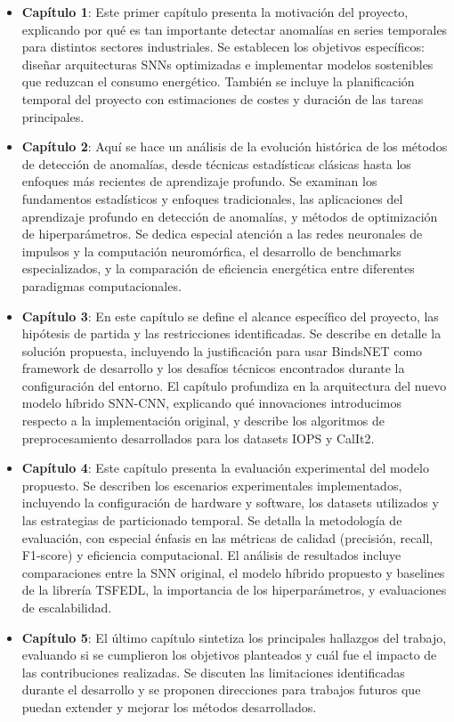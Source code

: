 \begin{itemize}
    \item\textbf{Capítulo 1}: Este primer capítulo presenta la motivación del proyecto, explicando por qué es tan importante detectar anomalías en series temporales para distintos sectores industriales. Se establecen los objetivos específicos: diseñar arquitecturas SNNs optimizadas e implementar modelos sostenibles que reduzcan el consumo energético. También se incluye la planificación temporal del proyecto con estimaciones de costes y duración de las tareas principales.
    
    \item\textbf{Capítulo 2}: Aquí se hace un análisis de la evolución histórica de los métodos de detección de anomalías, desde técnicas estadísticas clásicas hasta los enfoques más recientes de aprendizaje profundo. Se examinan los fundamentos estadísticos y enfoques tradicionales, las aplicaciones del aprendizaje profundo en detección de anomalías, y métodos de optimización de hiperparámetros. Se dedica especial atención a las redes neuronales de impulsos y la computación neuromórfica, el desarrollo de benchmarks especializados, y la comparación de eficiencia energética entre diferentes paradigmas computacionales.
    
    \item\textbf{Capítulo 3}: En este capítulo se define el alcance específico del proyecto, las hipótesis de partida y las restricciones identificadas. Se describe en detalle la solución propuesta, incluyendo la justificación para usar BindsNET como framework de desarrollo y los desafíos técnicos encontrados durante la configuración del entorno. El capítulo profundiza en la arquitectura del nuevo modelo híbrido SNN-CNN, explicando qué innovaciones introducimos respecto a la implementación original, y describe los algoritmos de preprocesamiento desarrollados para los datasets IOPS y CalIt2.
    
    \item\textbf{Capítulo 4}: Este capítulo presenta la evaluación experimental del modelo propuesto. Se describen los escenarios experimentales implementados, incluyendo la configuración de hardware y software, los datasets utilizados y las estrategias de particionado temporal. Se detalla la metodología de evaluación, con especial énfasis en las métricas de calidad (precisión, recall, F1-score) y eficiencia computacional. El análisis de resultados incluye comparaciones entre la SNN original, el modelo híbrido propuesto y baselines de la librería TSFEDL, la importancia de los hiperparámetros, y evaluaciones de escalabilidad.
    
    \item\textbf{Capítulo 5}: El último capítulo sintetiza los principales hallazgos del trabajo, evaluando si se cumplieron los objetivos planteados y cuál fue el impacto de las contribuciones realizadas. Se discuten las limitaciones identificadas durante el desarrollo y se proponen direcciones para trabajos futuros que puedan extender y mejorar los métodos desarrollados.
\end{itemize}

